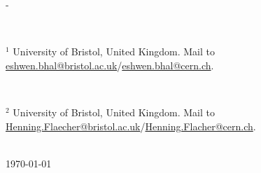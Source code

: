 \begin{titlingpage}
\begin{SingleSpace}
\begin{adjustwidth*}{\unitlength}{-\unitlength}
\begin{center}
\begin{minipage}{10cm}
      \
  
      $^{\text{1}}$ University of Bristol, United Kingdom. Mail to \href{mailto:eshwen.bhal@bristol.ac.uk}{eshwen.bhal@bristol.ac.uk}/\href{mailto:eshwen.bhal@cern.ch}{eshwen.bhal@cern.ch}.
  
      \
  
      $^{\text{2}}$ University of Bristol, United Kingdom. Mail to \href{mailto:Henning.Flaecher@bristol.ac.uk}{Henning.Flaecher@bristol.ac.uk}/\href{mailto:Henning.Flacher@cern.ch}{Henning.Flacher@cern.ch}.
    \end{minipage}\\
    \vspace{9mm}
    {\large\textsc{\today}}  %
    \vspace{12mm}
    \end{center}
    \end{adjustwidth*}
    \end{SingleSpace}
  \end{titlingpage}
